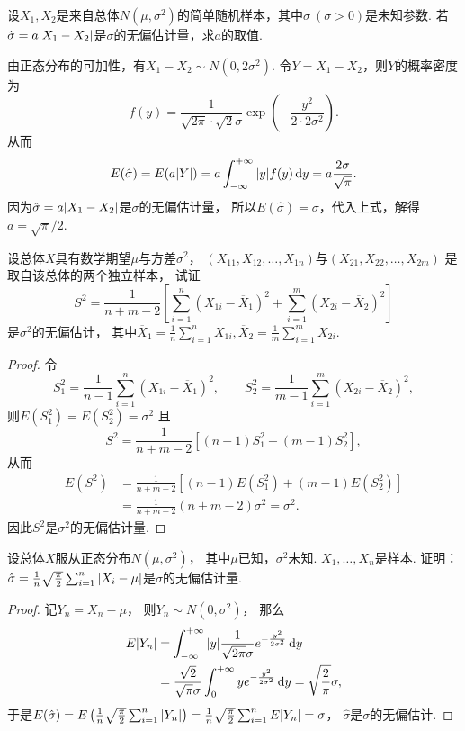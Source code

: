 \begin{example}
设\(X_1,X_2\)是来自总体\(N(\mu,\sigma^2)\)的简单随机样本，其中\(\sigma\ (\sigma>0)\)是未知参数.
若\(\hat{\sigma} = a\abs{X_1-X_2}\)是\(\sigma\)的无偏估计量，求\(a\)的取值.
\begin{solution}
由正态分布的可加性，有\(X_1-X_2 \sim N(0,2\sigma^2)\).
令\(Y = X_1-X_2\)，则\(Y\)的概率密度为\[
f(y) = \frac{1}{\sqrt{2\pi} \cdot \sqrt{2} \sigma} \exp(-\frac{y^2}{2 \cdot 2 \sigma^2}).
\]从而\[
	E(\hat{\sigma}) = E(a \abs{Y})
	= a \int_{-\infty}^{+\infty} \abs{y} f(y) \dd{y}
	= a \frac{2 \sigma}{\sqrt{\pi}}.
\]
因为\(\hat{\sigma} = a\abs{X_1-X_2}\)是\(\sigma\)的无偏估计量，
所以\(E(\hat{\sigma}) = \sigma\)，代入上式，解得\(a = \sqrt{\pi}/2\).
\end{solution}
\end{example}

\begin{example}
设总体\(X\)具有数学期望\(\mu\)与方差\(\sigma^2\)，
\((X_{11},X_{12},\dotsc,X_{1n})\)与\((X_{21},X_{22},\dotsc,X_{2m})\)
是取自该总体的两个独立样本，
试证\[
	S^2 = \frac1{n+m-2} \left[
		\sum_{i=1}^n (X_{1i}-\overline{X}_1)^2
		+ \sum_{i=1}^m (X_{2i}-\overline{X}_2)^2
	\right]
\]是\(\sigma^2\)的无偏估计，
其中\(\overline{X}_1 = \frac1n \sum_{i=1}^n X_{1i},
\overline{X}_2 = \frac1m \sum_{i=1}^m X_{2i}\).
\begin{proof}
令\[
	S^2_1 = \frac1{n-1} \sum_{i=1}^n (X_{1i}-\overline{X}_1)^2, \qquad
	S^2_2 = \frac1{m-1} \sum_{i=1}^m (X_{2i}-\overline{X}_2)^2,
\]
则\(E(S^2_1)=E(S^2_2)=\sigma^2\)
且\[
	S^2 = \frac1{n+m-2} \left[
		(n-1) S^2_1
		+ (m-1) S^2_2
	\right],
\]
从而\begin{align*}
	E(S^2)
	&= \frac1{n+m-2} \left[
		(n-1) E(S^2_1)
		+ (m-1) E(S^2_2)
	\right] \\
	&= \frac1{n+m-2} (n+m-2) \sigma^2
	= \sigma^2.
\end{align*}
因此\(S^2\)是\(\sigma^2\)的无偏估计量.
\end{proof}
\end{example}

\begin{example}
设总体\(X\)服从正态分布\(N(\mu,\sigma^2)\)，
其中\(\mu\)已知，\(\sigma^2\)未知.
\(X_1,\dotsc,X_n\)是样本.
证明：\(\hat\sigma
= \frac1n \sqrt{\frac\pi2} \sum_{i=1}^n \abs{X_i - \mu}\)是\(\sigma\)的无偏估计量.
\begin{proof}
记\(Y_n = X_n-\mu\)，
则\(Y_n \sim N(0,\sigma^2)\)，
那么\begin{align*}
	E\abs{Y_n}
	&= \int_{-\infty}^{+\infty}
	\abs{y} \frac1{\sqrt{2\pi} \sigma}
	e^{-\frac{y^2}{2\sigma^2}} \dd{y} \\
	&= \frac{\sqrt2}{\sqrt\pi \sigma} \int_0^{+\infty}
	y e^{-\frac{y^2}{2\sigma^2}} \dd{y}
	= \sqrt{\frac2\pi} \sigma,
\end{align*}
于是\(E(\hat\sigma)
= E\left(\frac1n \sqrt{\frac\pi2} \sum_{i=1}^n \abs{Y_n}\right)
= \frac1n \sqrt{\frac\pi2} \sum_{i=1}^n E\abs{Y_n}
= \sigma\)，
\(\hat\sigma\)是\(\sigma\)的无偏估计.
\end{proof}
\end{example}

